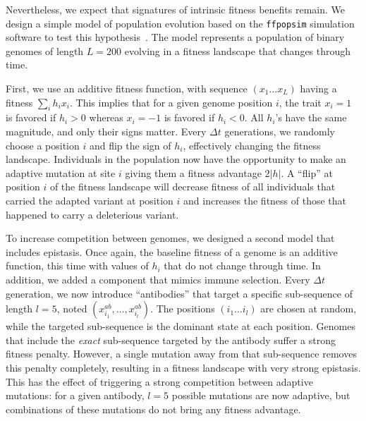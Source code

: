 \documentclass[reprint,amsmath,amssymb,superscriptaddress,showpacs,rmp]{revtex4-1}
\begin{document}
Nevertheless, we expect that signatures of intrinsic fitness benefits remain.
We design a simple model of population evolution based on the \texttt{ffpopsim} simulation software to test this hypothesis~\cite{10.1093/bioinformatics/bts633}.
The model represents a population of binary genomes of length $L=200$ evolving in a fitness landscape that changes through time.

First, we use an additive fitness function, with sequence $(x_1\ldots x_L)$ having a fitness $\sum_i h_i x_i$.
This implies that for a given genome position $i$, the trait $x_i = 1$ is favored if $h_i>0$ whereas  $x_i = -1$ is favored if $h_i<0$.
All $h_i$'s have the same magnitude, and only their signs matter.
Every $\Delta t$ generations, we randomly choose a position $i$ and flip the sign of $h_i$, effectively changing the fitness landscape.
Individuals in the population now have the opportunity to make an adaptive mutation at site $i$ giving them a fitness advantage $2\vert h \vert$.
A ``flip'' at position $i$ of the fitness landscape will decrease fitness of all individuals that carried the adapted variant at position $i$ and increases the fitness of those that happened to carry a deleterious variant.

To increase competition between genomes, we designed a second model that includes epistasis.
Once again, the baseline fitness of a genome is an additive function, this time with values of $h_i$ that do not change through time.
In addition, we added a component that mimics immune selection.
Every $\Delta t$ generation, we now introduce ``antibodies'' that target a specific sub-sequence of length $l=5$, noted $(x^{ab}_{i_1}, \ldots, x^{ab}_{i_l})$.
The positions $(i_1\ldots i_l)$ are chosen at random, while the targeted sub-sequence is the dominant state at each position.
Genomes that include the \emph{exact} sub-sequence targeted by the antibody suffer a strong fitness penalty. However, a single mutation away from that sub-sequence removes this penalty completely, resulting in a fitness landscape with very strong epistasis.
This has the effect of triggering a strong competition between adaptive mutations: for a given antibody, $l=5$ possible mutations are now adaptive, but combinations of these mutations do not bring any fitness advantage.
\end{document}

